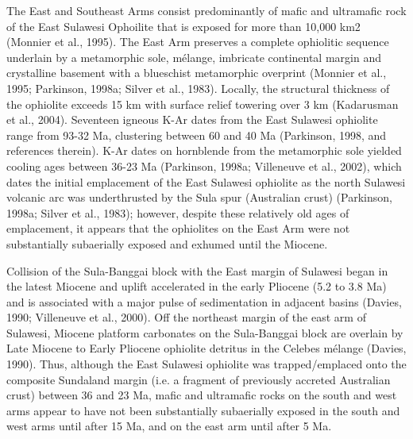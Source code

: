 \documentclass[11pt,letterpaper]{article}
\begin{document}
The East and Southeast Arms consist predominantly of mafic and ultramafic rock of the East Sulawesi Ophoilite that is exposed for more than 10,000 km2 (Monnier et al., 1995). The East Arm preserves a complete ophiolitic sequence underlain by a metamorphic sole, mélange, imbricate continental margin and crystalline basement with a blueschist metamorphic overprint (Monnier et al., 1995; Parkinson, 1998a; Silver et al., 1983). Locally, the structural thickness of the ophiolite exceeds 15 km with surface relief towering over 3 km (Kadarusman et al., 2004). Seventeen igneous K-Ar dates from the East Sulawesi ophiolite range from 93-32 Ma, clustering between 60 and 40 Ma (Parkinson, 1998, and references therein). K-Ar dates on hornblende from the metamorphic sole yielded cooling ages between 36-23 Ma (Parkinson, 1998a; Villeneuve et al., 2002), which dates the initial emplacement of the East Sulawesi ophiolite as the north Sulawesi volcanic arc was underthrusted by the Sula spur (Australian crust) (Parkinson, 1998a; Silver et al., 1983); however, despite these relatively old ages of emplacement, it appears that the ophiolites on the East Arm were not substantially subaerially exposed and exhumed until the Miocene.  

Collision of the Sula-Banggai block with the East margin of Sulawesi began in the latest Miocene and uplift accelerated in the early Pliocene (5.2 to 3.8 Ma) and is associated with a major pulse of sedimentation in adjacent basins (Davies, 1990; Villeneuve et al., 2000). Off the northeast margin of the east arm of Sulawesi, Miocene platform carbonates on the Sula-Banggai block are overlain by Late Miocene to Early Pliocene ophiolite detritus in the Celebes mélange (Davies, 1990). Thus, although the East Sulawesi ophiolite was trapped/emplaced onto the composite Sundaland margin (i.e. a fragment of previously accreted Australian crust) between 36 and 23 Ma, mafic and ultramafic rocks on the south and west arms appear to have not been substantially subaerially exposed in the south and west arms until after 15 Ma, and on the east arm until after 5 Ma.
\end{document}
